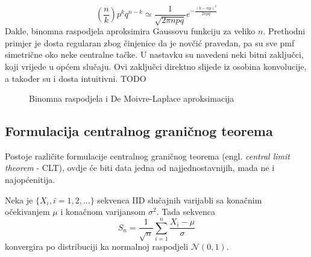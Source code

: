 \begin{equation}
  \left(\frac{n}{k}\right) p^kq^{n-k} \simeq \frac{1}{\sqrt{2\pi npq}}
  e^{-\frac{(k-np)^2}{2npq}}
\end{equation}
Dakle, binomna raspodjela aproksimira Gaussovu funkciju za veliko $n$.
Prethodni primjer je dosta regularan zbog činjenice da je novčić pravedan, pa su
sve pmf simetrične oko neke centralne tačke. U nastavku su navedeni neki bitni
zaključci, koji vrijede u općem slučaju. Ovi zaključci direktno slijede iz
osobina konvolucije, a također su i dosta intuitivni.
TODO

\begin{figure}[H]
  \centering
	\caption{Binomna raspodjela i De Moivre-Laplace aproksimacija}
  \label{fig:binom}
\end{figure}

\subsection{Formulacija centralnog graničnog teorema}

Postoje različite formulacije centralnog graničnog teorema (engl.
\textit{central limit theorem} - CLT), ovdje će biti data jedna od
najjednostavnijih, mada ne i najopćenitija.
\begin{theorem} \label{th:clt}
  Neka je $\{X_i, i=1,2,...\}$ sekvenca IID slučajnih varijabli sa
  konačnim očekivanjem $\mu$ i konačnom varijansom $\sigma^2$. Tada
  sekvenca
  \begin{equation}
    S_n = \frac{1}{\sqrt{n}} \sum_{i=1}^{n} \frac{X_i-\mu}{\sigma}
  \end{equation}
  konvergira po distribuciji ka normalnoj raspodjeli $\mathcal{N}(0, 1)$.
\end{theorem}


